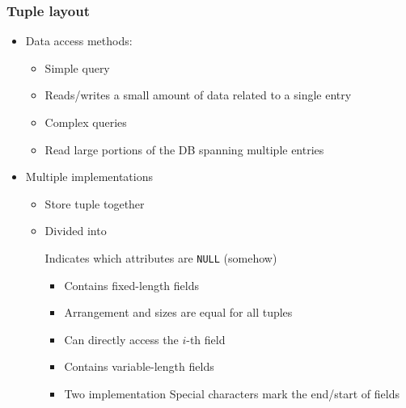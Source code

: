 \subsubsection{Tuple layout}
\begin{itemize}
    \item Data access methods:
            \begin{itemize}
                \item Simple query
                \item Reads/writes a small amount of data related to a single entry
            \end{itemize}
            \begin{itemize}
                \item Complex queries
                \item Read large portions of the DB spanning multiple entries
            \end{itemize}
        \item Multiple implementations
        \begin{itemize}
            \item Store tuple together
            \item Divided into
                \begin{itemize}
                     Indicates which attributes are \verb+NULL+ (somehow)
                        \begin{itemize}
                            \item Contains fixed-length fields
                            \item Arrangement and sizes are equal for all tuples
                            \item Can directly access the $i$-th field
                        \end{itemize}
                        \begin{itemize}
                            \item Contains variable-length fields
                            \item Two implementation
                             Special characters mark the end/start of fields
                                \begin{itemize}

\end{itemize}
\end{itemize}
\end{itemize}
\end{itemize}
\end{itemize}
